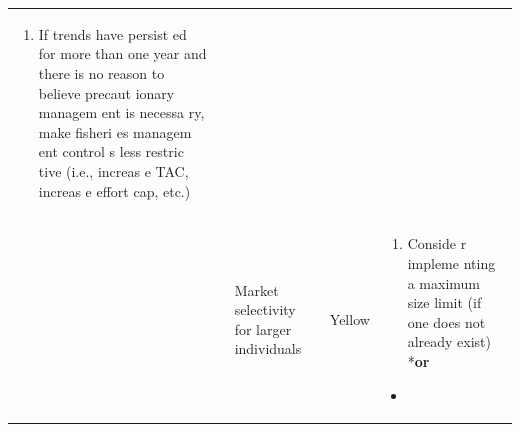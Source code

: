 \documentclass[]{book}
\providecommand{\tightlist}{%
  \setlength{\itemsep}{0pt}\setlength{\parskip}{0pt}}
\begin{document}
\begin{longtable}[]{@{}lllll@{}}
\begin{minipage}[t]{0.19\columnwidth}
\begin{enumerate}
\def\labelenumi{\arabic{enumi}.}
\setcounter{enumi}{1}
\tightlist
\item
  If trends have persist ed for more than one year and there is no
  reason to believe precaut ionary managem ent is necessa ry, make
  fisheri es managem ent control s less restric tive (i.e., increas e
  TAC, increas e effort cap, etc.)
\end{enumerate}\strut
\end{minipage}\tabularnewline
\begin{minipage}[t]{0.19\columnwidth}\raggedright\strut
\strut
\end{minipage} & \begin{minipage}[t]{0.19\columnwidth}\raggedright\strut
\strut
\end{minipage} & \begin{minipage}[t]{0.19\columnwidth}\raggedright\strut
Market selectivity for larger individuals\strut
\end{minipage} & \begin{minipage}[t]{0.19\columnwidth}\raggedright\strut
Yellow\strut
\end{minipage} & \begin{minipage}[t]{0.19\columnwidth}\raggedright\strut
\begin{enumerate}
\def\labelenumi{\arabic{enumi}.}
\tightlist
\item
  Conside r impleme nting a maximum size limit (if one does not already
  exist) *\textbf{or}
\end{enumerate}

\begin{itemize}
\item
\end{itemize}


\end{minipage}
\end{longtable}
\end{document}
